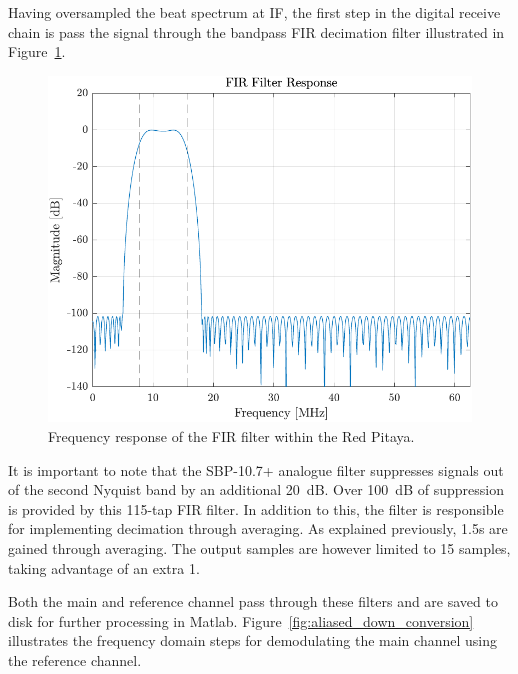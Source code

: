 \documentclass[a4paper,11pt]{report}
\begin{document}
Having oversampled the beat spectrum at IF, the first step in the digital receive chain is pass the signal through the bandpass FIR decimation filter illustrated in Figure~\ref{fig:fir_filter}.  
\begin{figure}[h!]
    \begin{center}
        \includegraphics[width=\textwidth]{images/fir_filter}
        \caption{Frequency response of the FIR filter within the Red Pitaya.}
        \label{fig:fir_filter}
    \end{center}
\end{figure}

It is important to note that the SBP-10.7+ analogue filter suppresses signals out of the second Nyquist band by an additional \SI{20}{\dB}. Over \SI{100}{\dB} of suppression is provided by this 115-tap FIR filter. In addition to this, the filter is responsible for implementing decimation through averaging. As explained previously, \SI{1.5}{\bit}s are gained through averaging. The output samples are however limited to \SI{15}{\bit} samples, taking advantage of an extra \SI{1}{\bit}.

Both the main and reference channel pass through these filters and are saved to disk for further processing in Matlab. Figure~\ref{fig:aliased_down_conversion} illustrates the frequency domain steps for demodulating the main channel using the reference channel.
\end{document}

